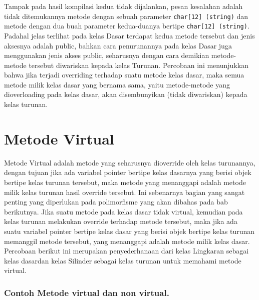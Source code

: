 Tampak pada hasil kompilasi kedua tidak dijalankan, pesan kesalahan
adalah tidak ditemukannya metode dengan sebuah parameter
\texttt{char{[}12{]}\ (string)} dan metode dengan dua buah parameter
kedua-duanya bertipe \texttt{char{[}12{]}\ (string)}. Padahal jelas
terlihat pada kelas Dasar terdapat kedua metode tersebut dan jenis
aksesnya adalah public, bahkan cara penurunannya pada kelas Dasar juga
menggunakan jenis akses public, seharusnya dengan cara demikian
metode-metode tersebut diwariskan kepada kelas Turunan. Percobaan ini
menunjukkan bahwa jika terjadi overriding terhadap suatu metode kelas
dasar, maka semua metode milik kelas dasar yang bernama sama, yaitu
metode-metode yang dioverloading pada kelas dasar, akan disembunyikan
(tidak diwariskan) kepada kelas turunan.

\section{Metode Virtual}\label{metode-virtual}

Metode Virtual adalah metode yang seharusnya dioverride oleh kelas
turunannya, dengan tujuan jika ada variabel pointer bertipe kelas
dasarnya yang berisi objek bertipe kelas turunan tersebut, maka metode
yang menanggapi adalah metode milik kelas turunan hasil override
tersebut. Ini sebenarnya bagian yang sangat penting yang diperlukan pada
polimorfisme yang akan dibahas pada bab berikutnya. Jika suatu metode
pada kelas dasar tidak virtual, kemudian pada kelas turunan melakukan
override terhadap metode tersebut, maka jika ada suatu variabel pointer
bertipe kelas dasar yang berisi objek bertipe kelas turunan memanggil
metode tersebut, yang menanggapi adalah metode milik kelas dasar.
Percobaan berikut ini merupakan penyederhanaan dari kelas Lingkaran
sebagai kelas dasardan kelas Silinder sebagai kelas turunan untuk
memahami metode virtual.

\subsubsection*{Contoh Metode virtual dan non virtual.}

